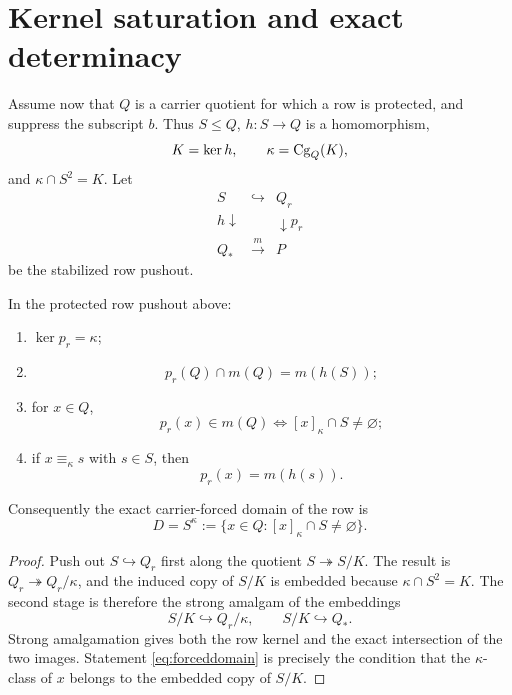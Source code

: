 \section{Kernel saturation and exact determinacy}\label{sec:kernelsat}

Assume now that $Q$ is a carrier quotient for which a row is protected, and suppress the subscript $b$.  Thus $S\le Q$, $h:S\to Q$ is a homomorphism,
\[
K=\ker h,
\qquad
\kappa=\operatorname{Cg}_Q(K),
\]
and $\kappa\cap S^2=K$.  Let
\[
\begin{array}{ccc}
S & \hookrightarrow & Q_r\\
{\scriptstyle h}\downarrow && \downarrow{\scriptstyle p_r}\\
Q_* & \xrightarrow{m} & P
\end{array}
\]
be the stabilized row pushout.

\begin{theorem}\label{thm:kernelsat}
In the protected row pushout above:
\begin{enumerate}[label=(\roman*)]
\item $\ker p_r=\kappa$;
\item
\[
p_r(Q)\cap m(Q)=m(h(S));
\]
\item for $x\in Q$,
\begin{equation}\label{eq:forceddomain}
p_r(x)\in m(Q)
\iff
[x]_{\kappa}\cap S\neq\varnothing;
\end{equation}
\item if $x\equiv_{\kappa}s$ with $s\in S$, then
\[
p_r(x)=m(h(s)).
\]
\end{enumerate}
Consequently the exact carrier-forced domain of the row is
\begin{equation}\label{eq:Db}
D=S^{\kappa}
:=
\{x\in Q:[x]_{\kappa}\cap S\neq\varnothing\}.
\end{equation}
\end{theorem}

\begin{proof}
Push out $S\hookrightarrow Q_r$ first along the quotient $S\twoheadrightarrow S/K$.  The result is $Q_r\twoheadrightarrow Q_r/\kappa$, and the induced copy of $S/K$ is embedded because $\kappa\cap S^2=K$.  The second stage is therefore the strong amalgam of the embeddings
\[
S/K\hookrightarrow Q_r/\kappa,
\qquad
S/K\hookrightarrow Q_*.
\]
Strong amalgamation gives both the row kernel and the exact intersection of the two images.  Statement \eqref{eq:forceddomain} is precisely the condition that the $\kappa$-class of $x$ belongs to the embedded copy of $S/K$.
\end{proof}

